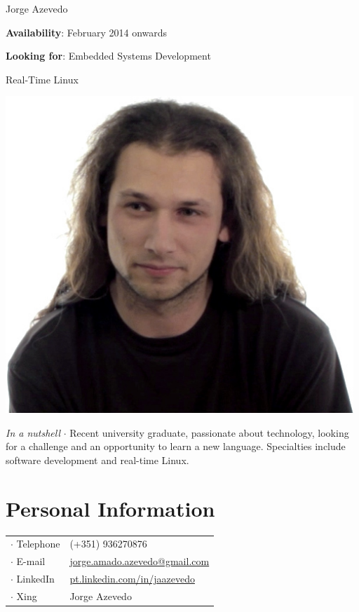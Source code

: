 



\topSection
{
	{\Huge Jorge Azevedo}

	\vspace{1.5mm}
	\vspace*{10mm}

	\textbf{Availability}: February 2014 onwards

	\textbf{Looking for}: Embedded Systems Development

	\hspace{66pt}Real-Time Linux
} {
	\includegraphics[width=0.985\textwidth]{img/photo}
}

\emph{In a nutshell} $\cdot$  Recent university graduate, passionate about
technology, looking for a challenge and an opportunity to learn a new language.
Specialties include software development and real-time Linux.

\section*{Personal Information}

{
\begin{tabular}[t]{@{}l l}
	$\cdot$  Telephone & (+351) 936270876 \\
	$\cdot$  E-mail & \href{mailto:jorge.amado.azevedo@gmail.com}{jorge.amado.azevedo@gmail.com} \\
	$\cdot$  LinkedIn & \href{http://pt.linkedin.com/in/jaazevedo}{pt.linkedin.com/in/jaazevedo}\\
	$\cdot$  Xing & Jorge Azevedo\\
\end{tabular}
}

